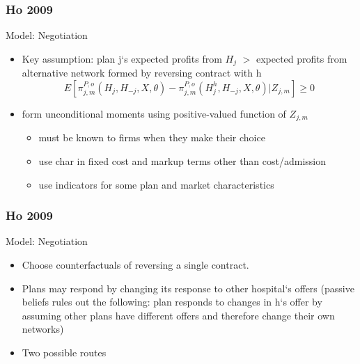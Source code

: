 \documentclass[notes=show]{beamer}
\begin{document}
\begin{frame}
\frametitle{Ho 2009}

Model: Negotiation
\begin{itemize}
\item Key assumption: plan j`s expected profits from $H_{j}$ $>$ expected profits from alternative network formed by reversing contract with h
\[
E[\pi _{j,m}^{P,o}(H_{j},H_{-j},X,\theta )-\pi
_{j,m}^{P,o}(H_{j}^{h},H_{-j},X,\theta )|Z_{j,m}]\geq 0
\]
\item form unconditional moments using positive-valued function of $Z_{j,m}$
\begin{itemize}
\item must be known to firms when they make their choice
\item use char in fixed cost and markup terms other than cost/admission
\item use indicators for some plan and market characteristics
\end{itemize}

\end{itemize}

\end{frame}

\begin{frame}
\frametitle{Ho 2009}

Model: Negotiation
\begin{itemize}
\item Choose counterfactuals of reversing a single contract.
\item Plans may respond by changing its response to other hospital`s offers (passive beliefs rules out the following: plan responds to changes in h`s offer by assuming other plans have different offers and therefore change their own networks)
\item Two possible routes
\end{itemize}

\end{frame}
\end{document}
